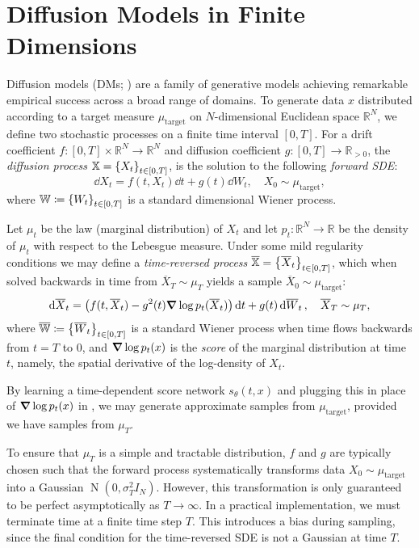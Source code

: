 \section{Diffusion Models in Finite Dimensions}
Diffusion models (DMs; \citealp{song2021scorebasedgenerativemodelingstochastic}) are a family of generative models achieving remarkable empirical success across a broad range of domains. To generate data \(x\) distributed according to a target measure \(\mu_{\text{target}}\) on \(N\)-dimensional Euclidean space \(\mathbb{R}^{N}\), we define two stochastic processes on a finite time interval \([0, T]\). For a drift coefficient \(f : [0, T] \times \mathbb{R}^{N} \to \mathbb{R}^{N}\) and diffusion coefficient \(g : [0, T] \to \mathbb{R}_{> 0}\), the  \textit{diffusion process} \(\mathbb{X} = \qty{X_{t}}_{t \in [0, T]}\), is the solution to the following \textit{forward SDE}:
\[
  \dd{X_{t}} = f(t, X_{t}) \dd{t} + g(t) \dd{W_{t}},\quad X_{0} \sim \mu_{\text{target}},
\]
where \(\mathbb{W} \coloneqq \qty{W_{t}}_{t \in [0, T]}\) is a standard dimensional Wiener process.

Let \(\mu_{t}\) be the law (marginal distribution) of \(X_{t}\) and let \(p_{t}: \mathbb{R}^{N} \to \mathbb{R}\) be the density of \(\mu_{t}\) with respect to the Lebesgue measure. Under some mild regularity conditions \citep{anderson1982reverse} we may define a \textit{time-reversed process} \(\overline{\mathbb{X}} = \qty{ \overline{X}_{t}}_{t \in [0, T]}\), which when solved backwards in time from \(\overline{X}_{T} \sim \mu_{T}\) yields a sample \(\overline{X}_{0} \sim \mu_{\text{target}}\):
\begin{equation}
  \dd{ \overline{X}_{t}} = \qty(f(t, \overline{X}_{t}) - g^{2}(t) \grad \log p_{t}(\overline{X}_{t}))\dd{t} + g(t) \dd{ \overline{W}_{t}},  \quad \overline{X}_{T} \sim \mu_{T}, \label{eqn:dm-reverse}
\end{equation}
where \( \overline{\mathbb{W}} \coloneqq \qty{ \overline{W}_{t}}_{t \in [0, T]}\) is a standard Wiener process when time flows backwards from \(t = T\) to \(0\), and \(\grad \log p_{t}(x)\) is the \textit{score} of the marginal distribution at time \(t\), namely, the spatial derivative of the log-density of \(X_{t}\).

By learning a time-dependent score network \(s_{\theta}(t, x)\) and plugging this in place of \(\grad \log p_{t}(x)\) in , we may generate approximate samples from \(\mu_{\text{target}}\), provided we have samples from \(\mu_{T}\).

To ensure that \(\mu_{T}\) is a simple and tractable distribution, \(f\) and \(g\) are typically chosen such that the forward process systematically transforms data \(X_{0} \sim \mu_{\text{target}}\) into a Gaussian \(\operatorname{N}(0, \sigma^{2}_{T} I_{N})\). However, this transformation is only guaranteed to be perfect asymptotically as \(T \to \infty\). In a practical implementation, we must terminate time at a finite time step \(T\). This introduces a bias during sampling, since the final condition for the time-reversed SDE is not a Gaussian at time \(T\).

